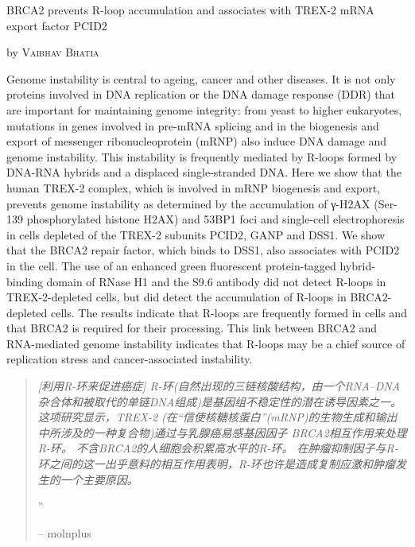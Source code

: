 \documentclass[10pt,a4paper]{article}
\newcommand{\NewsItem}[1]{ %
\usefont{T1}{fvs}{n}{n} %
\vspace{24pt}\large #1\vspace{3pt} %
\par \normalsize \normalfont}
\newcommand{\NewsAuthor}[1]{ %
\hfill by \textsc{#1} \vspace{20pt} %
\par \normalfont}
\begin{document}
\begin{multicols}{2}

\NewsItem{BRCA2 prevents R-loop accumulation and associates with TREX-2 mRNA export factor PCID2}
\NewsAuthor{Vaibhav Bhatia}

Genome instability is central to ageing, cancer and other diseases. It is not only proteins involved in DNA replication or the DNA damage response (DDR) that are important for maintaining genome integrity: from yeast to higher eukaryotes, mutations in genes involved in pre-mRNA splicing and in the biogenesis and export of messenger ribonucleoprotein (mRNP) also induce DNA damage and genome instability. This instability is frequently mediated by R-loops formed by DNA-RNA hybrids and a displaced single-stranded DNA. Here we show that the human TREX-2 complex, which is involved in mRNP biogenesis and export, prevents genome instability as determined by the accumulation of γ-H2AX (Ser-139 phosphorylated histone H2AX) and 53BP1 foci and single-cell electrophoresis in cells depleted of the TREX-2 subunits PCID2, GANP and DSS1. We show that the BRCA2 repair factor, which binds to DSS1, also associates with PCID2 in the cell. The use of an enhanced green fluorescent protein-tagged hybrid-binding domain of RNase H1 and the S9.6 antibody did not detect R-loops in TREX-2-depleted cells, but did detect the accumulation of R-loops in BRCA2-depleted cells. The results indicate that R-loops are frequently formed in cells and that BRCA2 is required for their processing. This link between BRCA2 and RNA-mediated genome instability indicates that R-loops may be a chief source of replication stress and cancer-associated instability.\cite{BhaBarGar1406}

\begin{quotation} %

\noindent\normalsize\textit{[利用R-环来促进癌症] R-环(自然出现的三链核酸结构，由一个RNA–DNA杂合体和被取代的单链DNA组成)是基因组不稳定性的潜在诱导因素之一。
这项研究显示，TREX-2 (在“信使核糖核蛋白”(mRNP)的生物生成和输出中所涉及的一种复合物)通过与乳腺癌易感基因因子 BRCA2相互作用来处理R-环。
不含BRCA2的人细胞会积累高水平的R-环。
在肿瘤抑制因子与R-环之间的这一出乎意料的相互作用表明，R-环也许是造成复制应激和肿瘤发生的一个主要原因。}

\hfill{\Huge''}

\hfill-- molnplus
\end{quotation}



\end{multicols}
\end{document}

